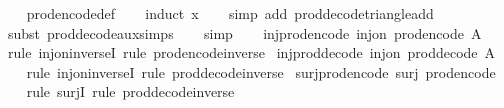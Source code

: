 \begin{isabellebody}
%
\isadelimproof
\ \ %
\endisadelimproof
%
\isatagproof
{}\isamarkupfalse%
\ prod{\isacharunderscore}encode{\isacharunderscore}def\isanewline
\ \ \isamarkupfalse%
\ {\isacharparenleft}induct\ x{\isacharparenright}\isanewline
\ \ \isamarkupfalse%
\ {\isacharparenleft}simp\ add{\isacharcolon}\ prod{\isacharunderscore}decode{\isacharunderscore}triangle{\isacharunderscore}add{\isacharparenright}\isanewline
\ \ \isamarkupfalse%
\ {\isacharparenleft}subst\ prod{\isacharunderscore}decode{\isacharunderscore}aux{\isachardot}simps{\isacharparenright}\isanewline
\ \ \isamarkupfalse%
\ simp\isanewline
\ \ \isamarkupfalse%
%
\endisatagproof
{\isafoldproof}%
%
\isadelimproof
\isanewline
%
\endisadelimproof
\isanewline
{}\isamarkupfalse%
\ inj{\isacharunderscore}prod{\isacharunderscore}encode{\isacharcolon}\ {\isachardoublequoteopen}inj{\isacharunderscore}on\ prod{\isacharunderscore}encode\ A{\isachardoublequoteclose}\isanewline
%
\isadelimproof
\ \ %
\endisadelimproof
%
\isatagproof
{}\isamarkupfalse%
\ {\isacharparenleft}rule\ inj{\isacharunderscore}on{\isacharunderscore}inverseI{\isacharparenright}\ {\isacharparenleft}rule\ prod{\isacharunderscore}encode{\isacharunderscore}inverse{\isacharparenright}%
\endisatagproof
{\isafoldproof}%
%
\isadelimproof
\isanewline
%
\endisadelimproof
\isanewline
{}\isamarkupfalse%
\ inj{\isacharunderscore}prod{\isacharunderscore}decode{\isacharcolon}\ {\isachardoublequoteopen}inj{\isacharunderscore}on\ prod{\isacharunderscore}decode\ A{\isachardoublequoteclose}\isanewline
%
\isadelimproof
\ \ %
\endisadelimproof
%
\isatagproof
{}\isamarkupfalse%
\ {\isacharparenleft}rule\ inj{\isacharunderscore}on{\isacharunderscore}inverseI{\isacharparenright}\ {\isacharparenleft}rule\ prod{\isacharunderscore}decode{\isacharunderscore}inverse{\isacharparenright}%
\endisatagproof
{\isafoldproof}%
%
\isadelimproof
\isanewline
%
\endisadelimproof
\isanewline
{}\isamarkupfalse%
\ surj{\isacharunderscore}prod{\isacharunderscore}encode{\isacharcolon}\ {\isachardoublequoteopen}surj\ prod{\isacharunderscore}encode{\isachardoublequoteclose}\isanewline
%
\isadelimproof
\ \ %
\endisadelimproof
%
\isatagproof
{}\isamarkupfalse%
\ {\isacharparenleft}rule\ surjI{\isacharparenright}\ {\isacharparenleft}rule\ prod{\isacharunderscore}decode{\isacharunderscore}inverse{\isacharparenright}%
\endisatagproof
{\isafoldproof}%
%
\isadelimproof
\isanewline
%
\endisadelimproof
\isanewline

\end{isabellebody}
